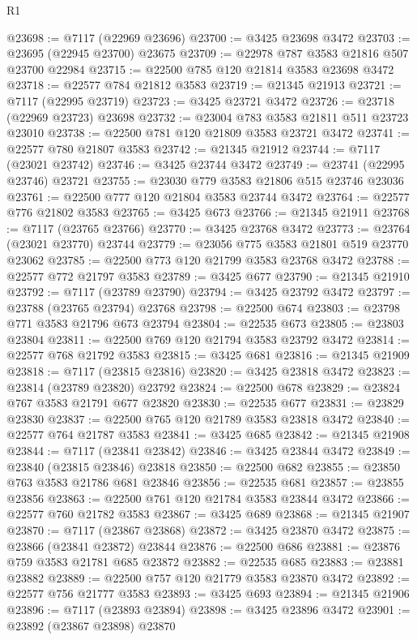 \begin{lexlean}{R1}
\begin{coremodule}
@23698 := @7117 (@22969 @23696)
@23700 := @3425 @23698 @3472
@23703 := @23695 (@22945 @23700) @23675
@23709 := @22978 @787 @3583 @21816 @507 @23700 @22984
@23715 := @22500 @785 @120 @21814 @3583 @23698 @3472
@23718 := @22577 @784 @21812 @3583
@23719 := @21345 @21913
@23721 := @7117 (@22995 @23719)
@23723 := @3425 @23721 @3472
@23726 := @23718 (@22969 @23723) @23698
@23732 := @23004 @783 @3583 @21811 @511 @23723 @23010
@23738 := @22500 @781 @120 @21809 @3583 @23721 @3472
@23741 := @22577 @780 @21807 @3583
@23742 := @21345 @21912
@23744 := @7117 (@23021 @23742)
@23746 := @3425 @23744 @3472
@23749 := @23741 (@22995 @23746) @23721
@23755 := @23030 @779 @3583 @21806 @515 @23746 @23036
@23761 := @22500 @777 @120 @21804 @3583 @23744 @3472
@23764 := @22577 @776 @21802 @3583
@23765 := @3425 @673
@23766 := @21345 @21911
@23768 := @7117 (@23765 @23766)
@23770 := @3425 @23768 @3472
@23773 := @23764 (@23021 @23770) @23744
@23779 := @23056 @775 @3583 @21801 @519 @23770 @23062
@23785 := @22500 @773 @120 @21799 @3583 @23768 @3472
@23788 := @22577 @772 @21797 @3583
@23789 := @3425 @677
@23790 := @21345 @21910
@23792 := @7117 (@23789 @23790)
@23794 := @3425 @23792 @3472
@23797 := @23788 (@23765 @23794) @23768
@23798 := @22500 @674
@23803 := @23798 @771 @3583 @21796 @673 @23794
@23804 := @22535 @673
@23805 := @23803 @23804
@23811 := @22500 @769 @120 @21794 @3583 @23792 @3472
@23814 := @22577 @768 @21792 @3583
@23815 := @3425 @681
@23816 := @21345 @21909
@23818 := @7117 (@23815 @23816)
@23820 := @3425 @23818 @3472
@23823 := @23814 (@23789 @23820) @23792
@23824 := @22500 @678
@23829 := @23824 @767 @3583 @21791 @677 @23820
@23830 := @22535 @677
@23831 := @23829 @23830
@23837 := @22500 @765 @120 @21789 @3583 @23818 @3472
@23840 := @22577 @764 @21787 @3583
@23841 := @3425 @685
@23842 := @21345 @21908
@23844 := @7117 (@23841 @23842)
@23846 := @3425 @23844 @3472
@23849 := @23840 (@23815 @23846) @23818
@23850 := @22500 @682
@23855 := @23850 @763 @3583 @21786 @681 @23846
@23856 := @22535 @681
@23857 := @23855 @23856
@23863 := @22500 @761 @120 @21784 @3583 @23844 @3472
@23866 := @22577 @760 @21782 @3583
@23867 := @3425 @689
@23868 := @21345 @21907
@23870 := @7117 (@23867 @23868)
@23872 := @3425 @23870 @3472
@23875 := @23866 (@23841 @23872) @23844
@23876 := @22500 @686
@23881 := @23876 @759 @3583 @21781 @685 @23872
@23882 := @22535 @685
@23883 := @23881 @23882
@23889 := @22500 @757 @120 @21779 @3583 @23870 @3472
@23892 := @22577 @756 @21777 @3583
@23893 := @3425 @693
@23894 := @21345 @21906
@23896 := @7117 (@23893 @23894)
@23898 := @3425 @23896 @3472
@23901 := @23892 (@23867 @23898) @23870

\end{coremodule}
\end{lexlean}
